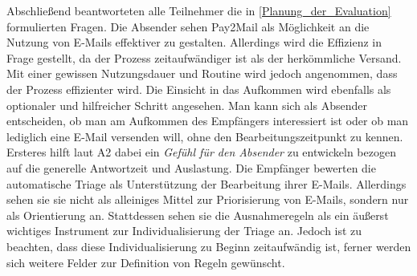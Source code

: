 Abschließend beantworteten alle Teilnehmer die in \ref{Planung_der_Evaluation} formulierten Fragen. Die Absender sehen Pay2Mail als Möglichkeit an die Nutzung von E-Mails effektiver zu gestalten. Allerdings wird die Effizienz in Frage gestellt, da der Prozess zeitaufwändiger ist als der herkömmliche Versand. Mit einer gewissen Nutzungsdauer und Routine wird jedoch angenommen, dass der Prozess effizienter wird. Die Einsicht in das Aufkommen wird ebenfalls als optionaler und hilfreicher Schritt angesehen. Man kann sich als Absender entscheiden, ob man am Aufkommen des Empfängers interessiert ist oder ob man lediglich eine E-Mail versenden will, ohne den Bearbeitungszeitpunkt zu kennen. Ersteres hilft laut A2 dabei ein \emph{\glqq Gefühl für den Absender\grqq{}} zu entwickeln bezogen auf die generelle Antwortzeit und Auslastung. Die Empfänger bewerten die automatische Triage als Unterstützung der Bearbeitung ihrer E-Mails. Allerdings sehen sie sie nicht als alleiniges Mittel zur Priorisierung von E-Mails, sondern nur als Orientierung an. Stattdessen sehen sie die Ausnahmeregeln als ein äußerst wichtiges Instrument zur Individualisierung der Triage an. Jedoch ist zu beachten, dass diese Individualisierung zu Beginn zeitaufwändig ist, ferner werden sich weitere Felder zur Definition von Regeln gewünscht. 

